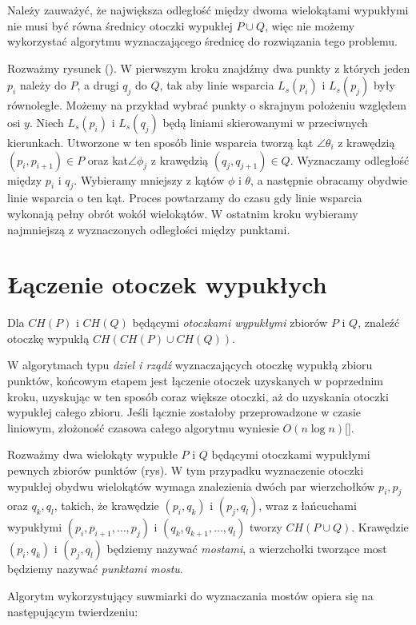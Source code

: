 Należy zauważyć, że największa odległość między dwoma wielokątami
wypukłymi nie musi być równa średnicy otoczki wypukłej $P \cup Q$,
więc nie możemy wykorzystać algorytmu wyznaczającego średnicę do
rozwiązania tego problemu.

Rozważmy rysunek (). W pierwszym kroku znajdźmy dwa punkty z których
jeden $p_i$ należy do $P$, a drugi $q_j$ do $Q$, tak aby linie
wsparcia $L_s(p_i)$ i $L_s(p_j)$ były równoległe. Możemy na przykład
wybrać punkty o skrajnym położeniu względem osi $y$. Niech $L_s(p_i)$
i $L_s(q_j)$ będą liniami skierowanymi w przeciwnych
kierunkach. Utworzone w ten sposób linie wsparcia tworzą kąt
$\angle{\theta_i}$ z krawędzią $(p_i, p_{i+1}) \in P$ oraz
kat$\angle{\phi_j}$ z krawędzią $(q_j, q_{j+1}) \in Q$. Wyznaczamy
odległość między $p_i$ i $q_j$. Wybieramy mniejszy z kątów $\phi$ i
$\theta$, a następnie obracamy obydwie linie wsparcia o ten
kąt. Proces powtarzamy do czasu gdy linie wsparcia wykonają pełny
obrót wokół wielokątów. W ostatnim kroku wybieramy najmniejszą z
wyznaczonych odległości między punktami.

\section{Łączenie otoczek wypukłych}
\begin{problem}
  Dla $CH(P)$ i $CH(Q)$ będącymi \emph{otoczkami wypukłymi} zbiorów $P$ i
  $Q$, znaleźć otoczkę wypukłą $CH(CH(P) \cup CH(Q))$.
\end{problem}

W algorytmach typu \emph{dziel i rządź} wyznaczających otoczkę wypukłą
zbioru punktów, końcowym etapem jest łączenie otoczek uzyskanych w
poprzednim kroku, uzyskując w ten sposób coraz większe otoczki, aż do
uzyskania otoczki wypukłej całego zbioru. Jeśli łącznie zostałoby
przeprowadzone w czasie liniowym, złożoność czasowa całego algorytmu
wyniesie $O(n \log n)$[].

Rozważmy dwa wielokąty wypukłe $P$ i $Q$ będącymi otoczkami wypukłymi
pewnych zbiorów punktów (rys). W tym przypadku wyznaczenie otoczki
wypukłej obydwu wielokątów wymaga znalezienia dwóch par wierzchołków
$p_i, p_j$ oraz $q_k, q_l$, takich, że krawędzie $(p_i, q_k)$ i $(p_j,
q_l)$, wraz z łańcuchami wypukłymi $(p_i, p_{i+1}, \ldots, p_j)$ i
$(q_k, q_{k+1}, \ldots, q_l)$ tworzy $CH(P \cup Q)$. Krawędzie $(p_i,
q_k)$ i $(p_j, q_l)$ będziemy nazywać \emph{mostami}, a wierzchołki
tworzące most będziemy nazywać \emph{punktami mostu}.

Algorytm wykorzystujący suwmiarki do wyznaczania mostów opiera się na
następującym twierdzeniu:

